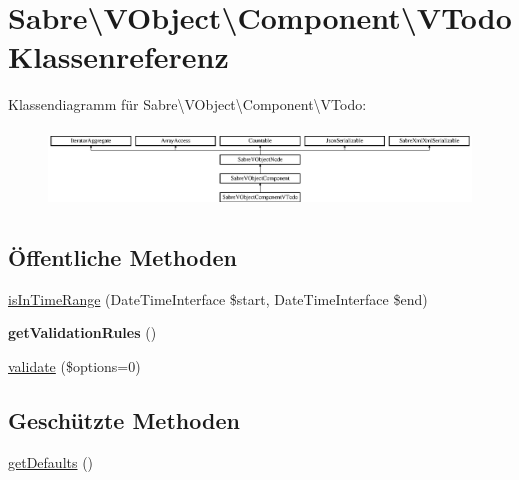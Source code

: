 \hypertarget{class_sabre_1_1_v_object_1_1_component_1_1_v_todo}{}\section{Sabre\textbackslash{}V\+Object\textbackslash{}Component\textbackslash{}V\+Todo Klassenreferenz}
\label{class_sabre_1_1_v_object_1_1_component_1_1_v_todo}
Klassendiagramm für Sabre\textbackslash{}V\+Object\textbackslash{}Component\textbackslash{}V\+Todo\+:\begin{figure}[H]
\begin{center}
\leavevmode
\includegraphics[height=2.113208cm]{class_sabre_1_1_v_object_1_1_component_1_1_v_todo}
\end{center}
\end{figure}
\subsection*{Öffentliche Methoden}
\begin{DoxyCompactItemize}
\item 
\mbox{\hyperlink{class_sabre_1_1_v_object_1_1_component_1_1_v_todo_a75eb793a476f7c67c08772893295758d}{is\+In\+Time\+Range}} (Date\+Time\+Interface \$start, Date\+Time\+Interface \$end)
\item 
\mbox{\label{class_sabre_1_1_v_object_1_1_component_1_1_v_todo_ac13a8e8c1d2638dafa1d3ea9bc4a7f1b}} 
{\bfseries get\+Validation\+Rules} ()
\item 
\mbox{\hyperlink{class_sabre_1_1_v_object_1_1_component_1_1_v_todo_af551857c3fd98e083a39ec8b6d04e9d3}{validate}} (\$options=0)
\end{DoxyCompactItemize}
\subsection*{Geschützte Methoden}
\begin{DoxyCompactItemize}
\item 
\mbox{\hyperlink{class_sabre_1_1_v_object_1_1_component_1_1_v_todo_a8e729cac6b23ca5467e80ce9f7841110}{get\+Defaults}} ()
\end{DoxyCompactItemize}
